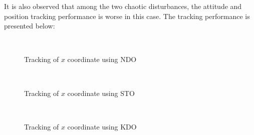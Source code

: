 \documentclass[letterpaper%
, twoside%
, 12pt%
,memoire%
, english%
,creativecommons,hyperref%
]{thETS}
\theoremstyle{newThmStyle}
\begin{document}
It is also observed that among the two chaotic disturbances, the attitude and position tracking performance is worse in this case. The tracking performance is presented below: 

\begin{figure}[H]
\centering
{}
\\ \parbox{0.75\textwidth}{\caption{Tracking of $x$ coordinate using NDO}\label{x_trac_dis_m1_ndo}}
\end{figure}

\begin{figure}[H]
\centering
{}
\\ \parbox{0.75\textwidth}{\caption{Tracking of $x$ coordinate using STO}\label{x_trac_dis_m1_sto}}
\end{figure}

\begin{figure}[H]
\centering
{}
\\ \parbox{0.75\textwidth}{\caption{Tracking of $x$ coordinate using KDO}\label{x_trac_dis_m1_kdo}}
\end{figure}
\end{document}
